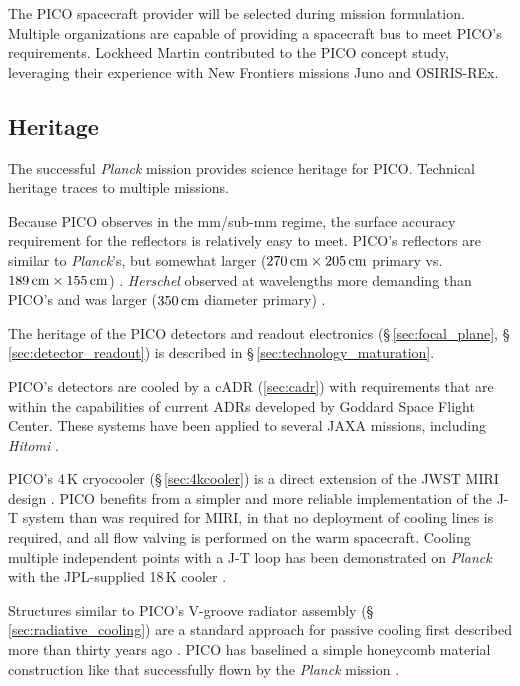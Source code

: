The PICO spacecraft provider will be selected during mission
formulation. Multiple organizations are capable of providing a
spacecraft bus to meet PICO's requirements. Lockheed Martin
contributed to the PICO concept study, leveraging their experience
with New Frontiers missions Juno and OSIRIS-REx.
 
\subsection{Heritage}
\label{sec:heritage} %

The successful \textit{Planck} mission provides science heritage for
PICO. Technical heritage traces to multiple missions.

Because PICO observes in the mm/sub-mm regime, the surface accuracy
requirement for the reflectors is relatively easy to meet. PICO's
reflectors are similar to \textit{Planck}'s, but somewhat larger
($270\,{\rm cm} \times 205\,{\rm cm}$ primary vs.\
$189\,{\rm cm} \times 155\,{\rm cm}$)
\citep{Gloesener2006}. \textit{Herschel} observed at wavelengths more
demanding than PICO's and was larger ($350\,{\rm cm}$ diameter
primary) \citep{Toulemont2004}.

The heritage of the PICO detectors and readout electronics
(\S\,\ref{sec:focal_plane}, \S\,\ref{sec:detector_readout}) is
described in \S\,\ref{sec:technology_maturation}.


PICO's detectors are cooled by a cADR (\ref{sec:cadr}) with
requirements that are within the capabilities of current ADRs
developed by Goddard Space Flight Center. These systems have been
applied to several JAXA missions, including \textit{Hitomi} \citep{Shirron2016}.

PICO's 4\,K cryocooler (\S\,\ref{sec:4kcooler}) is a direct extension
of the JWST MIRI design \citep{Durand2008,Rabb2013}. PICO benefits
from a simpler and more reliable implementation of the J-T system than
was required for MIRI, in that no deployment of cooling lines is
required, and all flow valving is performed on the warm
spacecraft. Cooling multiple independent points with a J-T loop has
been demonstrated on \textit{Planck} with the JPL-supplied 18\,K
cooler \citep{Planck2011}.

Structures similar to PICO's V-groove radiator assembly
(\S\,\ref{sec:radiative_cooling}) are a standard approach for passive
cooling first described more than thirty years ago
\citep{Bard1987}. 
PICO
has baselined a simple honeycomb material construction like that
successfully flown by the \textit{Planck} mission
\citep{ESA2009,Planck2011}.

